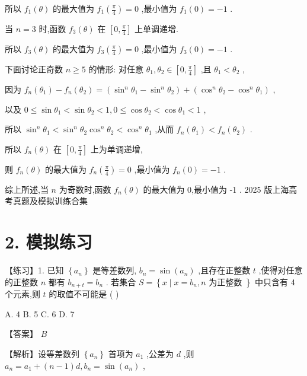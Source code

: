 \documentclass[10pt]{article}
\begin{document}
所以 \({f}_{1}\left( \theta \right)\) 的最大值为 \({f}_{1}\left( \frac{\pi }{4}\right)  = 0\) ,最小值为 \({f}_{1}\left( 0\right)  =  - 1\) .

当 \(n = 3\) 时,函数 \({f}_{3}\left( \theta \right)\) 在 \(\left\lbrack  {0,\frac{\pi }{4}}\right\rbrack\) 上单调递增.

所以 \({f}_{3}\left( \theta \right)\) 的最大值为 \({f}_{3}\left( \frac{\pi }{4}\right)  = 0\) ,最小值为 \({f}_{3}\left( 0\right)  =  - 1\) .

下面讨论正奇数 \(n \geq  5\) 的情形: 对任意 \({\theta }_{1},{\theta }_{2} \in  \left\lbrack  {0,\frac{\pi }{4}}\right\rbrack\) ,且 \({\theta }_{1} < {\theta }_{2}\) ,

因为 \({f}_{n}\left( {\theta }_{1}\right)  - {f}_{n}\left( {\theta }_{2}\right)  = \left( {{\sin }^{n}{\theta }_{1} - {\sin }^{n}{\theta }_{2}}\right)  + \left( {{\cos }^{n}{\theta }_{2} - {\cos }^{n}{\theta }_{1}}\right)\) ,

以及 \(0 \leq  \sin {\theta }_{1} < \sin {\theta }_{2} < 1,0 \leq  \cos {\theta }_{2} < \cos {\theta }_{1} < 1\) ,

所以 \({\sin }^{n}{\theta }_{1} < {\sin }^{n}{\theta }_{2}{\cos }^{n}{\theta }_{2} < {\cos }^{n}{\theta }_{1}\) ,从而 \({f}_{n}\left( {\theta }_{1}\right)  < {f}_{n}\left( {\theta }_{2}\right)\) .

所以 \({f}_{n}\left( \theta \right)\) 在 \(\left\lbrack  {0,\frac{\pi }{4}}\right\rbrack\) 上为单调递增,

则 \({f}_{n}\left( \theta \right)\) 的最大值为 \({f}_{n}\left( \frac{\pi }{4}\right)  = 0\) ,最小值为 \({f}_{n}\left( 0\right)  =  - 1\) .

综上所述,当 \(n\) 为奇数时,函数 \({f}_{n}\left( \theta \right)\) 的最大值为 0,最小值为 -1 . 2025 版上海高考真题及模拟训练合集

\section*{2. 模拟练习}

【练习】1. 已知 \(\left\{  {a}_{n}\right\}\) 是等差数列, \({b}_{n} = \sin \left( {a}_{n}\right)\) ,且存在正整数 \(t\) ,使得对任意的正整数 \(n\) 都有 \({b}_{n + t} = {b}_{n}\) . 若集合 \(S = \left\{  {x \mid  x = {b}_{n},n\text{ 为正整数 }}\right\}\) 中只含有 4 个元素,则 \(t\) 的取值不可能是 ( )

A. 4 B. 5 C. 6 D. 7

【答案】 \(B\)

【解析】设等差数列 \(\left\{  {a}_{n}\right\}\) 首项为 \({a}_{1}\) ,公差为 \(d\) ,则 \({a}_{n} = {a}_{1} + \left( {n - 1}\right) d,{b}_{n} = \sin \left( {a}_{n}\right)\) ,
\end{document}
